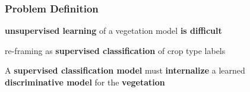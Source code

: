 \begin{frame}
\frametitle{Problem Definition}
\Large


\centering{}

\vspace{1em}
\raggedright

\begin{description}\setlength\itemsep{1em}
\item[\color{tumblue}Problem:]<1-> \textbf{unsupervised learning} of a vegetation model \textbf{is difficult}
\item[\color{tumblue}Solution:]<2-> re-framing as \textbf{supervised classification} of crop type labels
\item[\color{tumblue}Intuition:]<3-> A \textbf{supervised classification model} must \textbf{internalize} a learned \textbf{discriminative model} for the \textbf{vegetation}
\end{description}

\end{frame}